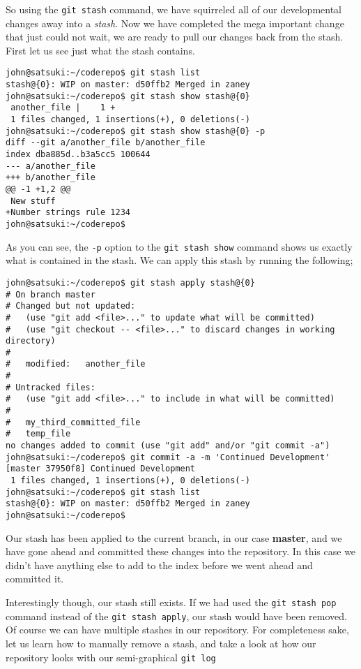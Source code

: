 So using the \texttt{git stash} command, we have squirreled all of our developmental changes away into a \emph{stash}.  Now we have completed the mega important change that just could not wait, we are ready to pull our changes back from the stash.  First let us see just what the stash contains.

\begin{Verbatim}[frame=leftline,framerule=1mm,fontsize=\relsize{-3}] 
john@satsuki:~/coderepo$ git stash list
stash@{0}: WIP on master: d50ffb2 Merged in zaney
john@satsuki:~/coderepo$ git stash show stash@{0}
 another_file |    1 +
 1 files changed, 1 insertions(+), 0 deletions(-)
john@satsuki:~/coderepo$ git stash show stash@{0} -p
diff --git a/another_file b/another_file
index dba885d..b3a5cc5 100644
--- a/another_file
+++ b/another_file
@@ -1 +1,2 @@
 New stuff
+Number strings rule 1234
john@satsuki:~/coderepo$ 
\end{Verbatim}

As you can see, the \texttt{-p} option to the \texttt{git stash show} command shows us exactly what is contained in the stash.  We can apply this stash by running the following;

\begin{Verbatim}[frame=leftline,framerule=1mm,fontsize=\relsize{-3}] 
john@satsuki:~/coderepo$ git stash apply stash@{0}
# On branch master
# Changed but not updated:
#   (use "git add <file>..." to update what will be committed)
#   (use "git checkout -- <file>..." to discard changes in working directory)
#
#	modified:   another_file
#
# Untracked files:
#   (use "git add <file>..." to include in what will be committed)
#
#	my_third_committed_file
#	temp_file
no changes added to commit (use "git add" and/or "git commit -a")
john@satsuki:~/coderepo$ git commit -a -m 'Continued Development'
[master 37950f8] Continued Development
 1 files changed, 1 insertions(+), 0 deletions(-)
john@satsuki:~/coderepo$ git stash list
stash@{0}: WIP on master: d50ffb2 Merged in zaney
john@satsuki:~/coderepo$ 
\end{Verbatim}

Our stash has been applied to the current branch, in our case \textbf{master}, and we have gone ahead and committed these changes into the repository.  In this case we didn't have anything else to add to the index before we went ahead and committed it.  

Interestingly though, our stash still exists.  If we had used the \texttt{git stash pop} command instead of the \texttt{git stash apply}, our stash would have been removed.  Of course we can have multiple stashes in our repository.  For completeness sake, let us learn how to manually remove a stash, and take a look at how our repository looks with our semi-graphical \texttt{git log}


